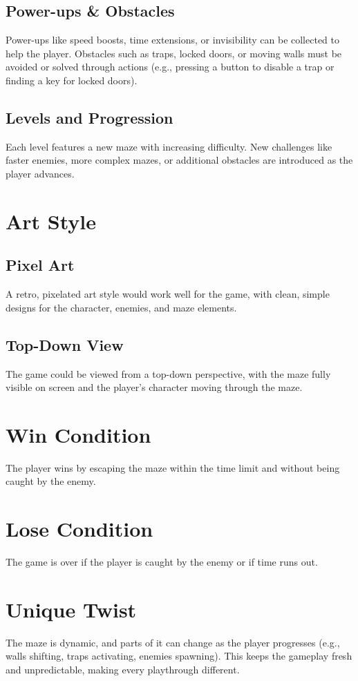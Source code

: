 \documentclass{article}
\begin{document}
\subsection{Power-ups \& Obstacles}
\noindent
Power-ups like speed boosts, time extensions, or invisibility can be collected to help the player. Obstacles such as traps, locked doors, or moving walls must be avoided or solved through actions (e.g., pressing a button to disable a trap or finding a key for locked doors).\\

\subsection{Levels and Progression}
\noindent
Each level features a new maze with increasing difficulty. New challenges like faster enemies, more complex mazes, or additional obstacles are introduced as the player advances.\\

\section{Art Style}

\subsection{Pixel Art}
\noindent
A retro, pixelated art style would work well for the game, with clean, simple designs for the character, enemies, and maze elements.\\

\subsection{Top-Down View}
\noindent
The game could be viewed from a top-down perspective, with the maze fully visible on screen and the player’s character moving through the maze.\\

\section{Win Condition}
\noindent
The player wins by escaping the maze within the time limit and without being caught by the enemy.

\section{Lose Condition}
\noindent
The game is over if the player is caught by the enemy or if time runs out.\\

\section{Unique Twist}
\noindent
The maze is dynamic, and parts of it can change as the player progresses (e.g., walls shifting, traps activating, enemies spawning). This keeps the gameplay fresh and unpredictable, making every playthrough different.\\
\end{document}
